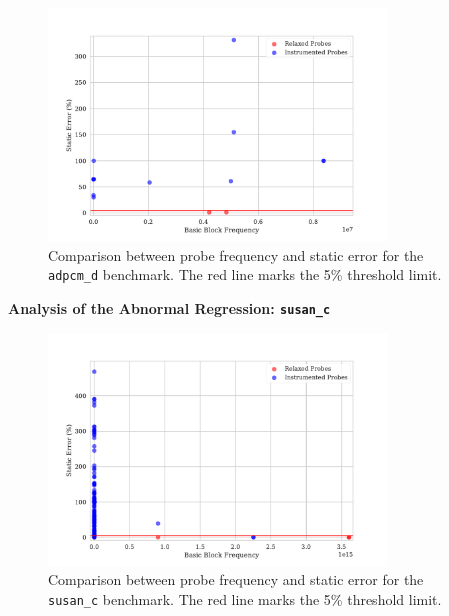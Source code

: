 \begin{figure}[htb]
    \centering
    \includegraphics[width=0.8\textwidth]{figs/adpcm_d.pdf}
    \caption{Comparison between probe frequency and static error for the \texttt{adpcm\_d} benchmark. The red line marks the 5\% threshold limit.}
    \label{fig:adpcm_d-probes-err-freq}
\end{figure}


\noindent \textbf{Analysis of the Abnormal Regression: \texttt{susan\_c}}

\begin{figure}[htb]
    \centering
    \includegraphics[width=0.8\textwidth]{figs/susan_c.pdf}
    \caption{Comparison between probe frequency and static error for the \texttt{susan\_c} benchmark. The red line marks the 5\% threshold limit.}
    \label{fig:speedups}
\end{figure}




